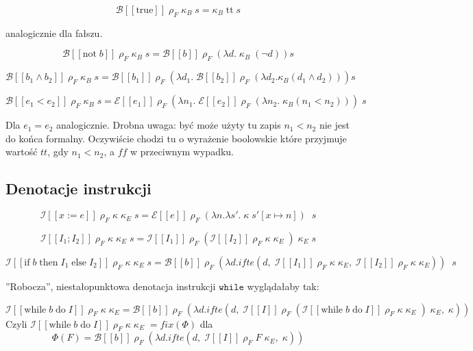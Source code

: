 \documentclass[a4paper]{article}
\begin{document}
$$
\mathcal{B}[\![ \text{true} ]\!] \; \rho_F \; \kappa_B \; s = \kappa_B \; \text{tt} \; s
$$

analogicznie dla fałszu.

$$
\mathcal{B}[\![ \text{not} \; b]\!] \; \rho_F \; \kappa_B \; s = \mathcal{B}[\![b]\!] \; \rho_F \; (\lambda d. \; \kappa_B \; (\lnot d) ) s
$$

$$
\mathcal{B}[\![b_1 \land b_2]\!] \; \rho_F \; \kappa_B \; s = \mathcal{B}[\![b_1 ]\!] \; \rho_F \; (\lambda d_1. \; \mathcal{B}[\![b_2]\!] \; \rho_F \; (\lambda d_2. \kappa_B(d_1 \land d_2))) s
$$

$$
\mathcal{B}[\![ e_1 < e_2 ]\!] \; \rho_F \; \kappa_B \; s = \mathcal{E}[\![e_1]\!] \; \rho_F \; (\lambda n_1. \;
\mathcal{E}[\![e_2]\!] \; \rho_F \; (\lambda n_2. \;
\kappa_B (n_1 < n_2))) \; s
$$

Dla $e_1 = e_2$ analogicznie. Drobna uwaga: być może użyty tu zapis $n_1 < n_2$ nie jest do końca formalny. Oczywiście chodzi tu o wyrażenie boolowskie które przyjmuje wartość $tt$, gdy $n_1 < n_2$, a $ff$ w przeciwnym wypadku.


\subsection*{Denotacje instrukcji}

$$
\mathcal{I}[\![ x := e ]\!] \; \rho_F \; \kappa \; \kappa_E \; s = \mathcal{E}[\![ e ]\!] \; \rho_F \; (\lambda n. \lambda s'. \; \kappa \; s'[x \mapsto n]) \; \; s
$$

$$
\mathcal{I}[\![ I_1; I_2 ]\!] \; \rho_F \; \kappa \; \kappa_E \; s = \mathcal{I}[\![ I_1 ]\!] \; \rho_F \; (
\mathcal{I}[\![ I_2 ]\!] \; \rho_F \; \kappa \; \kappa_E \;
) \; \kappa_E \; s
$$

$$
\mathcal{I}[\![ \text{if} \; b \; \text{then} \; I_1 \; \text{else} \; I_2 ]\!] \; \rho_F \; \kappa \; \kappa_E \; s = \mathcal{B}[\![ b ]\!] \; \rho_F \; (\lambda d. ifte (d, \;
\mathcal{I}[\![ I_1 ]\!] \; \rho_F \; \kappa \; \kappa_E
, \; 
\mathcal{I}[\![ I_2 ]\!] \; \rho_F \; \kappa \; \kappa_E
)) \; \; s
$$

''Robocza'', niestałopunktowa denotacja instrukcji $\texttt{while}$ wyglądałaby tak:

$$
\mathcal{I}[\![ \text{while} \; b \; \text{do} \; I  ]\!] \; \rho_F \; \kappa \; \kappa_E = \mathcal{B}[\![ b ]\!] \; \rho_F \; (\lambda d. ifte (d, \;
\mathcal{I}[\![ I ]\!] \; \rho_F \; (
\mathcal{I}[\![ \text{while} \; b \; \text{do} \; I ]\!] \; \rho_F \; \kappa \; \kappa_E \;
) \; \kappa_E
, \; 
\kappa
))
$$
Czyli $\mathcal{I}[\![ \text{while} \; b \; \text{do} \; I  ]\!] \; \rho_F \; \kappa \; \kappa_E \; = fix(\Phi)$ dla
$$
\Phi (F) = \mathcal{B}[\![ b ]\!] \; \rho_F \; (\lambda d. ifte (d, \;
\mathcal{I}[\![ I ]\!] \; \rho_F \; F \; \kappa_E
, \; 
\kappa
))
$$
\end{document}
